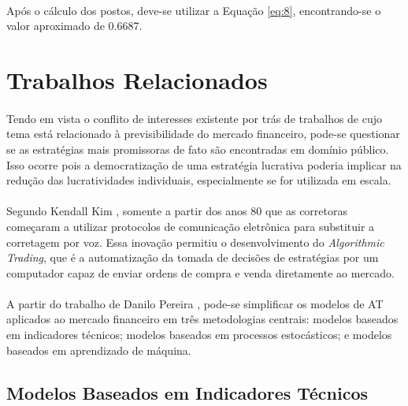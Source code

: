 \paragraph{} Após o cálculo dos postos, deve-se utilizar a Equação \ref{eq:8}, encontrando-se o valor aproximado de 0.6687.



\FloatBarrier
\section{Trabalhos Relacionados}

\paragraph{} Tendo em vista o conflito de interesses existente por trás de trabalhos de cujo tema está relacionado à previsibilidade do mercado financeiro, pode-se questionar se as estratégias mais promissoras de fato são encontradas em domínio público. Isso ocorre pois a democratização de uma estratégia lucrativa poderia implicar na redução das lucratividades individuais, especialmente se for utilizada em escala.

\paragraph{} Segundo Kendall Kim \cite{kim2010electronic}, somente a partir dos anos 80 que as corretoras começaram a utilizar protocolos de comunicação eletrônica para substituir a corretagem por voz. Essa inovação permitiu o desenvolvimento do \textit{Algorithmic Trading}, que é a automatização da tomada de decisões de estratégias por um computador capaz de enviar ordens de compra e venda diretamente ao mercado.

\paragraph{} A partir do trabalho de Danilo Pereira \cite{pereira2018financial}, pode-se simplificar os modelos de AT aplicados ao mercado financeiro em três metodologias centrais: modelos baseados em indicadores técnicos; modelos baseados em processos estocásticos; e modelos baseados em aprendizado de máquina.



\FloatBarrier
\subsection{Modelos Baseados em Indicadores Técnicos}

